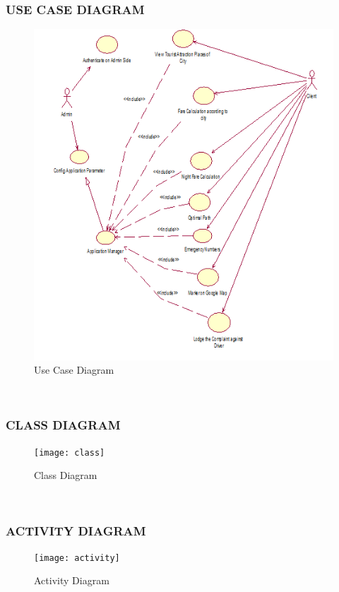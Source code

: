 \documentclass[12pt,a4paper]{article}
\begin{document}
\subsubsection{USE CASE DIAGRAM}
\begin{figure}[!htb]
\centering
\includegraphics[width=15 cm]{UseCase}
\caption{Use Case Diagram}
\end{figure}
\\
\newpage
\subsubsection{CLASS DIAGRAM}
\begin{figure}[!htb]
\centering
\texttt{[image: class]}
\caption{Class Diagram}
\end{figure}
\\
\newpage
\subsubsection{ACTIVITY DIAGRAM}
\begin{figure}[!htb]
\centering
\texttt{[image: activity]}
\caption{Activity Diagram}
\end{figure}
\\
\newpage
\end{document}
